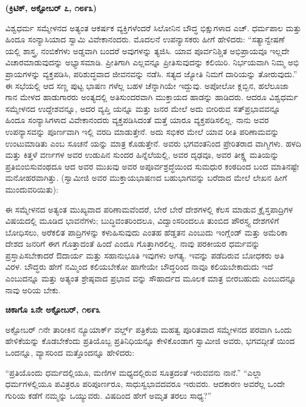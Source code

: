 \begin{center}
\textbf{(ಕ್ರಿಟಿಕ್​, ಅಕ್ಟೋಬರ್​ ೭, ೧೮೯೩)}
\end{center}

ವಿಶ್ವಧರ್ಮ ಸಮ್ಮೇಳನದ ಅತ್ಯಂತ ಆಕರ್ಷಕ ವ್ಯಕ್ತಿಗಳೆಂದರೆ ಸಿಲೋನಿನ ಬೌದ್ಧ ಭಿಕ್ಷುಗಳಾದ ಎಚ್​. ಧರ್ಮಪಾಲ ಮತ್ತು ಹಿಂದೂ ಸಂನ್ಯಾಸಿಯಾದ ಸ್ವಾಮಿ ವಿವೇಕಾನಂದರು. ಮೊದಲನೆ ಉಪನ್ಯಾಸಕರು ಹೀಗೆ ಹೇಳಿದರು: “ಸತ್ಯಾನ್ವೇಷಣೆ ಯಲ್ಲಿ ಶಾಸ್ತ್ರ, ನಂಬಿಕೆಗಳು ಅಡ್ಡವಾಗಿ ಬಂದರೆ ಅವುಗಳನ್ನು ತ್ಯಜಿಸಿ. ಯಾವ ಪೂರ್ವನಿಶ್ಚಿತ ಅಭಿಪ್ರಾಯವೂ ಇಲ್ಲದೇ ವಿಚಾರಮಾಡುವುದನ್ನು ಅಭ್ಯಾಸಮಾಡಿ. ಪ್ರೀತಿಗಾಗಿ ಎಲ್ಲವನ್ನೂ ಪ್ರೀತಿಸುವುದನ್ನು ಕಲಿಯಿರಿ. ನಿರ್ಭಯವಾಗಿ ನಿಮ್ಮ ಅಭಿ ಪ್ರಾಯಗಳನ್ನು ವ್ಯಕ್ತಪಡಿಸಿ, ಪರಿಶುದ್ಧವಾದ ಜೀವನವನ್ನು ನಡೆಸಿ. ಸತ್ಯದ ಜ್ಯೋತಿ ನಿಮಗೆ ದಾರಿಯನ್ನು ತೋರುವುದು.” ಈ ಸಭೆಯಲ್ಲಿ ಆದ ಸಣ್ಣ ಪುಟ್ಟ ಭಾಷಣ ಗಳೆಲ್ಲ ಬಹಳ ಚೆನ್ನಾಗಿಯೇ ಇದ್ದುವು. ಅಪೋಲೋ ಕ್ಲಬ್ಬಿನ, ಹಲೆಲೂಜಾ ಗಾನ ಮೇಳದ ಹಾಡುಗಾರರು ಅಂತ್ಯದಲ್ಲಿ ಅತಿಸುಂದರವಾಗಿ ಮುಕ್ತಾಯದ ಹಾಡನ್ನು ಹಾಡಿದರು. ಆದರೂ ವಿಶ್ವಧರ್ಮ ಸಮ್ಮೇಳನದ ಉದ್ದೇಶವನ್ನೂ, ಅದರ ವ್ಯಪ್ತಿ ಯನ್ನೂ ಮತ್ತು ಜನರ ಮೇಲೆ ಅದು ಬೀರಿರುವ ಸತ್​ಪ್ರಭಾವವನ್ನೂ ಹಿಂದೂ ಸಂನ್ಯಾಸಿಗಳಾದ ವಿವೇಕಾನಂದರು ವ್ಯಕ್ತಪಡಿಸಿದಂತೆ ಮತ್ತೆ ಯಾರೂ ವ್ಯಕ್ತಪಡಿಸಲಿಲ್ಲ. ನಾನು ಅವರ ಉಪನ್ಯಾಸವನ್ನು ಪೂರ್ಣವಾಗಿ ಇಲ್ಲಿ ವರದಿ ಮಾಡುತ್ತೇನೆ. ಅದು ಸಭಿಕರ ಮೇಲೆ ಯಾವ ರೀತಿ ಪರಿಣಾಮವನ್ನು ಉಂಟುಮಾಡಿತು ಎಂಬ ಸೂಚನೆ ಯನ್ನು ಮಾತ್ರ ಕೊಡುತ್ತೇನೆ. ಅವರು ಭಗವಂತನಿಂದ ಪ್ರೇರಿತರಾದ ವಾಗ್ಮಿಗಳು. ಹಳದಿ ಮತ್ತು ಕಿತ್ತಳೆ ವರ್ಣಗಳ ಅವರ ಉಡುಪಿನ ಸುಂದರ ಹಿನ್ನೆಲೆಯಲ್ಲಿ, ಅವರ ದೃಢವೂ, ಅವರ ತೀಕ್ಷ್ಣ ಮತಿಯನ್ನು ಪ್ರತಿಬಿಂಬಿಸುವಂಥದೂ ಆದ ಅವರ ಮುಖವು ಅವರ ಅಪೂರ್ವಶ್ರದ್ಧೆಯಿಂದ ಸುಮಧುರ ಕಂಠದಿಂದ ಬಂದ ಮಾತಿನಷ್ಟೇ ಮನೋಹರವಾಗಿತ್ತು. (ಸ್ವಾಮೀಜಿ ಅವರ ಮುಕ್ತಾಯಭಾಷಣದ ಬಹುಭಾಗವನ್ನು ಬರೆದಾದ ಮೇಲೆ ಲೇಖನ ಹೀಗೆ ಮುಂದುವರಿಯಿತು):

ಈ ಸಮ್ಮೇಳನದ ಅತ್ಯಂತ ಮುಖ್ಯವಾದ ಪರಿಣಾಮವೆಂದರೆ, ಬೇರೆ ಬೇರೆ ದೇಶಗಳಲ್ಲಿ ಕೆಲಸ ಮಾಡುವ ಕ್ರೈಸ್ತಪಾದ್ರಿಗಳ ವಿಷಯದಲ್ಲಿ ಮೂಡಿದ ಭಾವನೆಗಳು; ಬುದ್ಧಿವಂತರಿಂದಲೂ, ವಿದ್ವಾಂಸರಿಂದಲೂ ತುಂಬಿದ ಪೌರಸ್ತ್ಯ ದೇಶಗಳಿಗೆ ಬೋಧಿಸಲು, ಅರೆಕಲಿತ ಪಾದ್ರಿಗಳನ್ನು ಕಳುಹಿಸುವುದು ಎಂತಹ ಹೆಡ್ಡತನ ಎಂಬುದು ಇಂಗ್ಲೆಂಡ್​ ಮತ್ತು ಅಮೆರಿಕಾ ದೇಶದ ಜನರಿಗೆ ಈಗ ಗೊತ್ತಾದಂತೆ ಹಿಂದೆ ಎಂದೂ ಗೊತ್ತಾಗಿರಲಿಲ್ಲ. ನಾವು ಪರಕೀಯರ ಧರ್ಮವನ್ನು ಪ್ರಸ್ತಾಪಿಸಬೇಕಾದರೆ ಔದಾರ್ಯ ಮತ್ತು ಸಹಾನುಭೂತಿ ಇವುಗಳು ಅಗತ್ಯ. ಇವನ್ನು ಪಡೆದಿರುವ ಬೋಧಕರು ಅತಿ ವಿರಳ. ಬೌದ್ಧರು ಹೇಗೆ ನಮ್ಮಿಂದ ಕಲಿಯಬೇಕೋ ಹಾಗೇಯೇ ಬೌದ್ಧರಿಂದ ನಾವೂ ಕಲಿಯಬೇಕಾದುದು ಇದೆ ಎಂಬುದನ್ನೂ ಮತ್ತು ಅತ್ಯಂತ ಶ್ರೇಷ್ಠವಾದ ಪ್ರಭಾವ ವನ್ನು ಸೌಹಾರ್ದದ ಮೂಲಕ ಮಾತ್ರ ಬೀರಬಹುದು ಎಂಬುದನ್ನೂ ನಾವು ಅರಿಯ ಬೇಕು.

\delimiter

\textbf{ಚಿಕಾಗೊ ೩ನೇ ಅಕ್ಟೋಬರ್​, ೧೮೯೩} 

ಅಕ್ಟೋಬರ್​ ೧ನೇ ತಾರೀಕಿನ ನ್ಯೂಯಾರ್ಕ್​ ವರ್ಲ್ಡ್​ ಪತ್ರಿಕೆಯ ಮಹತ್ವ ಪೂರಿತವಾದ ಸಮ್ಮೇಳನದ ಪರವಾಗಿ ಒಂದು ಹೇಳಿಕೆಯನ್ನು ಕೊಡಬೇಕೆಂದು ಪ್ರತಿಯೊಬ್ಬ ಪ್ರತಿನಿಧಿಯನ್ನೂ ಕೇಳಿಕೊಂಡಾಗ ಸ್ವಾಮೀಜಿ ಅವರು, ಭಗವದ್ಗೀತೆ ಯಿಂದ ಒಂದನ್ನೂ, ವ್ಯಾಸರಿಂದ ಮತ್ತೊಂದನ್ನೂ ಹೇಳಿದರು:

“ಪ್ರತಿಯೊಂದು ಧರ್ಮದಲ್ಲಿಯೂ, ಮಣಿಗಳ ಮಧ್ಯದಲ್ಲಿರುವ ಸೂತ್ರದಂತೆ ಇರುವವನು ನಾನೆ.” “ಎಲ್ಲಾ ಧರ್ಮಗಳಲ್ಲಿಯೂ ಪವಿತ್ರರೂ ಪರಿಪೂರ್ಣರೂ, ಸಾಧುಸ್ವಭಾವದವರೂ ಇರುವರು. ಆದಕಾರಣ ಅವರೆಲ್ಲ ಒಂದೇ ಗುರಿಯ ಕಡೆಗೆ ನಮ್ಮನ್ನು ಒಯ್ಯುವರು. ವಿಷದಿಂದ ಹೇಗೆ ಅಮೃತ ತರಲು ಸಾಧ್ಯ?”

